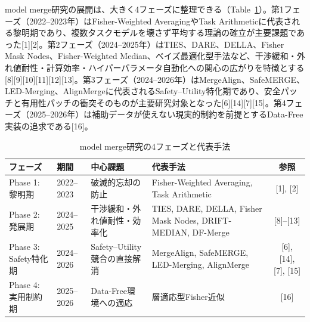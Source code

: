 \documentclass{article}
\begin{document}
model merge研究の展開は、大きく4フェーズに整理できる（Table~\ref{tab:merge-phases}）。第1フェーズ（2022–2023年）はFisher-Weighted AveragingやTask Arithmeticに代表される黎明期であり、複数タスクモデルを壊さず平均する理論の確立が主要課題であった[1][2]。第2フェーズ（2024–2025年）はTIES、DARE、DELLA、Fisher Mask Nodes、Fisher-Weighted Median、ベイズ最適化型手法など、干渉緩和・外れ値耐性・計算効率・ハイパーパラメータ自動化への関心の広がりを特徴とする[8][9][10][11][12][13]。第3フェーズ（2024–2026年）はMergeAlign、SafeMERGE、LED-Merging、AlignMergeに代表されるSafety–Utility特化期であり、安全パッチと有用性パッチの衝突そのものが主要研究対象となった[6][14][7][15]。第4フェーズ（2025–2026年）は補助データが使えない現実的制約を前提とするData-Free実装の追求である[16]。
\begin{table}[htbp]
\centering
\caption{model merge研究の4フェーズと代表手法}
\label{tab:merge-phases}
\small
\begin{tabular}{p{2.3cm}p{1.8cm}p{3.2cm}p{5.2cm}c}
\toprule
フェーズ & 期間 & 中心課題 & 代表手法 & 参照 \\
\midrule
Phase 1: 黎明期 & 2022--2023 & 破滅的忘却の防止 & Fisher-Weighted Averaging, Task Arithmetic & [1], [2] \\

Phase 2: 発展期 & 2024--2025 & 干渉緩和・外れ値耐性・効率化 & TIES, DARE, DELLA, Fisher Mask Nodes, DRIFT-MEDIAN, DF-Merge & [8]--[13] \\

Phase 3: Safety特化期 & 2024--2026 & Safety--Utility競合の直接解消 & MergeAlign, SafeMERGE, LED-Merging, AlignMerge & [6], [14], [7], [15] \\

Phase 4: 実用制約期 & 2025--2026 & Data-Free環境への適応
& 層適応型Fisher近似 & [16] \\
\bottomrule
\end{tabular}
\end{table}
\end{document}

